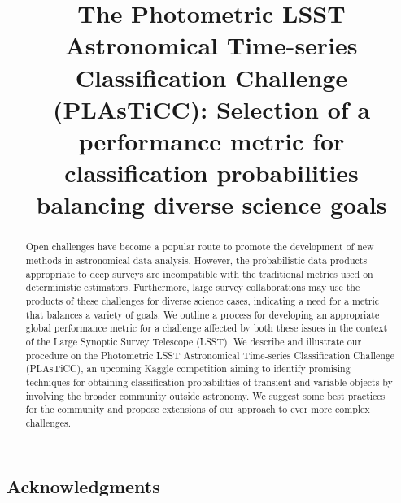 \documentclass[\docopts]{\docclass}
\begin{document}
\title{The Photometric LSST Astronomical Time-series Classification Challenge (PLAsTiCC): Selection of a performance metric for classification probabilities balancing diverse science goals}

\maketitlepre

\begin{abstract}

  Open challenges have become a popular route to promote the development of new methods in astronomical data analysis.
  However, the probabilistic data products appropriate to deep surveys are incompatible with the traditional metrics used on deterministic estimators.
  Furthermore, large survey collaborations may use the products of these challenges for diverse science cases, indicating a need for a metric that balances a variety of goals.
  We outline a process for developing an appropriate global performance metric for a challenge affected by both these issues in the context of the Large Synoptic Survey Telescope (LSST).
  We describe and illustrate our procedure on the Photometric LSST Astronomical Time-series Classification Challenge (PLAsTiCC), an upcoming Kaggle competition aiming to identify promising techniques for obtaining classification probabilities of transient and variable objects by involving the broader community outside astronomy.
  We suggest some best practices for the community and propose extensions of our approach to ever more complex challenges.

\end{abstract}

\dockeys{}

\maketitlepost















\subsection*{Acknowledgments}
\end{document}
